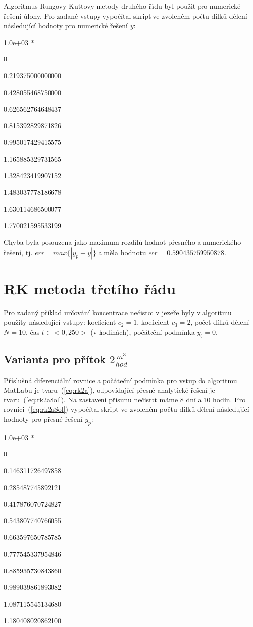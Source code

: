 \documentclass[a4paper,12pt]{article}
\begin{document}
Algoritmus Rungovy-Kuttovy metody druhého řádu byl použit pro numerické řešení úlohy. Pro zadané vstupy vypočítal skript ve zvoleném počtu dílků dělení následující hodnoty pro numerické řešení $y$:\bigskip

   1.0e+03 *\par

                   0\par
   0.219375000000000\par
   0.428055468750000\par
   0.626562764648437\par
   0.815392829871826\par
   0.995017429415575\par
   1.165885329731565\par
   1.328423419907152\par
   1.483037778186678\par
   1.630114686500077\par
   1.770021595533199\bigskip
   
   Chyba byla posouzena jako maximum rozdílů hodnot přesného a numerického řešení, tj. $err=max\{\left|y_p-y\right|\}$ a měla hodnotu $err=0.590435759950878$.
   
   \section{RK metoda třetího řádu}
Pro zadaný příklad určování koncentrace nečistot v jezeře byly v algoritmu použity následující vstupy: koeficient $c_2=1$, koeficient $c_3=2$, počet dílků dělení $N=10$, čas $t\in<0,250>$ (v hodinách), počáteční podmínka $y_0=0$.
\subsection{Varianta pro přítok $2\frac{m^3}{hod}$}
Příslušná diferenciální rovnice a počáteční podmínka pro vstup do algoritmu MatLabu je tvaru~(\ref{eq:rk2a}), odpovídající přesné analytické řešení je tvaru~(\ref{eq:rk2aSol}). Na zastavení přísunu nečistot máme 8 dní a 10 hodin. Pro rovnici~(\ref{eq:rk2aSol}) vypočítal skript ve zvoleném počtu dílků dělení následující hodnoty pro přesné řešení $y_p$:\bigskip 

   1.0e+03 *\par

                   0\par
   0.146311726497858\par
   0.285487745892121\par
   0.417876070724827\par
   0.543807740766055\par
   0.663597650785785\par
   0.777545337954846\par
   0.885935730843860\par
   0.989039861893082\par
   1.087115545134680\par
   1.180408020862100\bigskip
   
\end{document}

